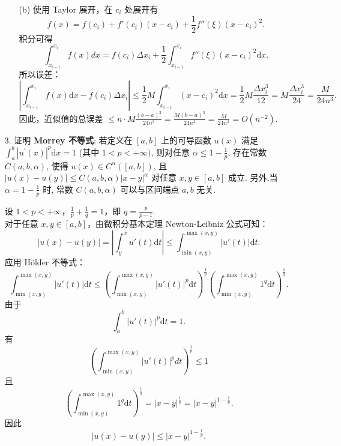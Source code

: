 \begin{enumerate}
\begin{solution}
\begin{enumerate}
        \item[(b)]
        使用 Taylor 展开，在 $c_i$ 处展开有
        \[
        f(x) = f(c_i) + f'(c_i)(x-c_i) + \frac{1}{2} f''(\xi)(x-c_i)^2.
        \]
        积分可得
        \[
        \int_{x_{i-1}}^{x_i} f(x) dx = f(c_i) \Delta x_i + \frac{1}{2} \int_{x_{i-1}}^{x_i} f''(\xi)(x-c_i)^2 \mathrm{d}x.
        \]
        所以误差：
        \[
        \left|\int_{x_{i-1}}^{x_i} f(x) \mathrm{d}x - f(c_i) \Delta x_i\right| \leq \frac{1}{2} M \int_{x_{i-1}}^{x_i} (x-c_i)^2 \mathrm{d}x = \frac{1}{2} M \frac{\Delta x_i^3}{12} = M \frac{\Delta x_i^3}{24}=\frac{M}{24n^3}.
        \]
        因此，近似值的总误差 $\displaystyle \leq n \cdot M \frac{(b-a)^3}{24n^3} = \frac{M(b-a)^3}{24n^2}=\frac{M}{24n^2}= O(n^{-2})$.
        \end{enumerate}
    \end{solution}
    
    \item[3.]证明 \textbf{Morrey 不等式}: 若定义在 \([a,b]\) 上的可导函数 \(u(x)\) 满足 \(\displaystyle \int_{a}^{b}|u^{\prime}(x)|^{p}\mathrm{d}x = 1\) (其中 \(\displaystyle 1< p< +\infty)\),
    则对任意 \(\displaystyle \alpha \leq 1 - \frac{1}{p}\), 存在常数 \(C(a,b,\alpha)\), 使得 \(\displaystyle u(x)\in C^{\alpha}([a,b])\), 且 \(\displaystyle |u(x) - u(y)|\leq C(a,b,\alpha)|x - y|^{\alpha}\) 对任意 \(x,y\in [a,b]\) 成立.
    另外,当 \(\displaystyle\alpha = 1 - \frac{1}{p}\) 时, 常数 \(C(a,b,\alpha)\) 可以与区间端点 \(a,b\) 无关.
    \begin{solution}
        设 $1 < p <+\infty$，$\displaystyle \frac{1}{p} + \frac{1}{q} = 1$，即 $\displaystyle q = \frac{p}{p-1}$.\\
        对于任意 $x, y \in [a,b]$，由微积分基本定理 Newton-Leibniz 公式可知：
        \[
        |u(x) - u(y)| = \left| \int_y^x u'(t) \mathrm{d}t \right| \leq \int_{\min(x,y)}^{\max(x,y)} |u'(t)| \mathrm{d}t.
        \]
        应用 Hölder 不等式：
        \[
        \int_{\min(x,y)}^{\max(x,y)} |u'(t)| \mathrm{d}t \leq \left( \int_{\min(x,y)}^{\max(x,y)} |u'(t)|^p \mathrm{d}t \right)^{\frac{1}{p}} \left( \int_{\min(x,y)}^{\max(x,y)} 1^q \mathrm{d}t \right)^{\frac{1}{q}}.
        \]
        由于
        \[
        \int_a^b |u'(t)|^p \mathrm{d}t = 1.
        \]
        有
        \[
        \left( \int_{\min(x,y)}^{\max(x,y)} |u'(t)|^p dt \right)^{\frac{1}{p}} \leq 1
        \]
        且
        \[
        \left( \int_{\min(x,y)}^{\max(x,y)} 1^q \mathrm{d}t \right)^{\frac{1}{q}} = |x-y|^{\frac{1}{q}} = |x-y|^{1 - \frac{1}{p}}.
        \]
        因此
        \[
        |u(x) - u(y)| \leq |x-y|^{1 -\frac{1}{p}}.
        \]


\end{solution}
\end{enumerate}
